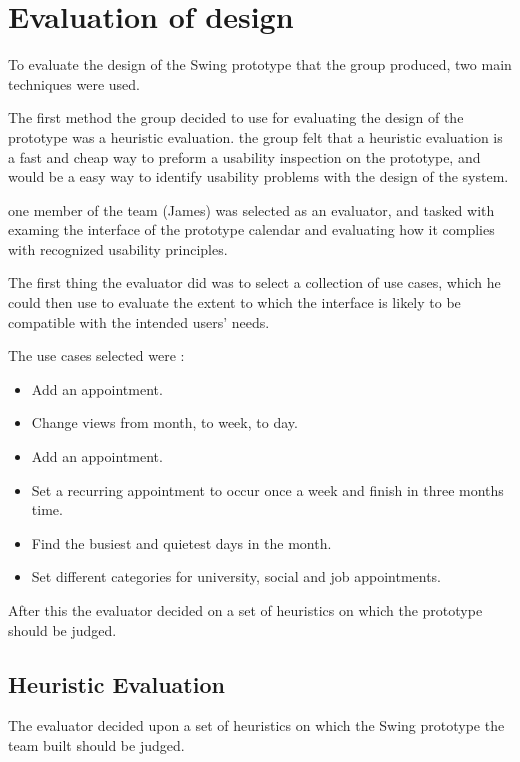 \documentclass{article}
\begin{document}
\section{Evaluation of design}

To evaluate the design of the Swing prototype that the group produced, two main techniques
were used.  

The first method the group decided to use for evaluating the design of the prototype was a
heuristic evaluation. 
the group felt that a heuristic evaluation is a fast and cheap way to preform a usability
inspection on the prototype, and would be a easy way to identify usability problems with the
design of the system. 

one member of the team (James) was selected as an evaluator, and tasked with examing the
interface of the prototype calendar and evaluating how it complies with recognized usability
principles. 

The first thing the evaluator did was to select a collection of use cases, which he could
then use to evaluate the extent to which the interface is likely to be compatible with the
intended users’ needs. 

The use cases selected were : 
\begin{itemize}
\item Add an appointment.
\item Change views from month, to week, to day.
\item Add an appointment.
\item Set a recurring appointment to occur once a week and finish in three months time.
\item Find the busiest and quietest days in the month.
\item Set different categories for university, social and job appointments.
\end{itemize}

After this the evaluator decided on a set of heuristics on which the prototype should be
judged. 

\subsection{Heuristic Evaluation}

The evaluator decided upon a set of heuristics on which the Swing prototype the team built
should be judged.
\end{document}

